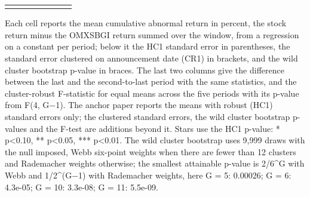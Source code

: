 \begin{threeparttable}
\begin{tabular}{@{}lccccccc}
\addlinespace[0.25ex]
\bottomrule
\end{tabular}
\endgroup
\noindent\begin{minipage}{\linewidth}\smallskip\footnotesize
Each cell reports the mean cumulative abnormal return in percent, the stock return minus the OMXSBGI return summed over the window, from a regression on a constant per period; below it the HC1 standard error in parentheses, the standard error clustered on announcement date (CR1) in brackets, and the wild cluster bootstrap p-value in braces. The last two columns give the difference between the last and the second-to-last period with the same statistics, and the cluster-robust F-statistic for equal means across the five periods with its p-value from F(4, G$-$1). The anchor paper reports the means with robust (HC1) standard errors only; the clustered standard errors, the wild cluster bootstrap p-values and the F-test are additions beyond it. Stars use the HC1 p-value: * p<0.10, ** p<0.05, *** p<0.01. The wild cluster bootstrap uses 9,999 draws with the null imposed, Webb six-point weights when there are fewer than 12 clusters and Rademacher weights otherwise; the smallest attainable p-value is 2/6\textasciicircum{}G with Webb and 1/2\textasciicircum{}(G$-$1) with Rademacher weights, here G = 5: 0.00026; G = 6: 4.3e-05; G = 10: 3.3e-08; G = 11: 5.5e-09.\end{minipage}

\end{threeparttable}